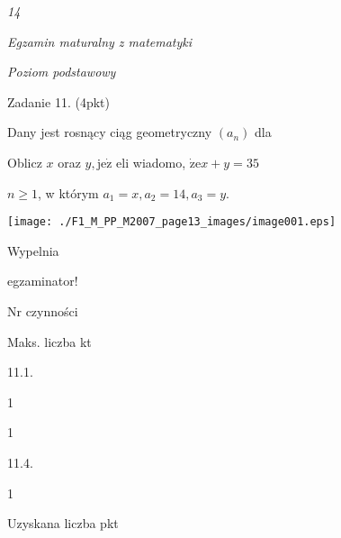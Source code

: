 \documentclass[a4paper,12pt]{article}
\begin{document}
{\it 14}

{\it Egzamin maturalny z matematyki}

{\it Poziom podstawowy}

Zadanie 11. (4pkt)

Dany jest rosnący ciąg geometryczny $(a_{n})$ dla

Oblicz $x$ oraz $y, \mathrm{j}\mathrm{e}\dot{\mathrm{z}}$ eli wiadomo, $\dot{\mathrm{z}}\mathrm{e}x+y=35$

$n\geq 1$, w którym $a_{1}=x, a_{2}=14, a_{3}=y.$
\begin{center}
\texttt{[image: ./F1\_M\_PP\_M2007\_page13\_images/image001.eps]}
\end{center}
Wypelnia

egzaminator!

Nr czynności

Maks. liczba kt

11.1.

1

1

11.4.

1

Uzyskana liczba pkt
\end{document}
